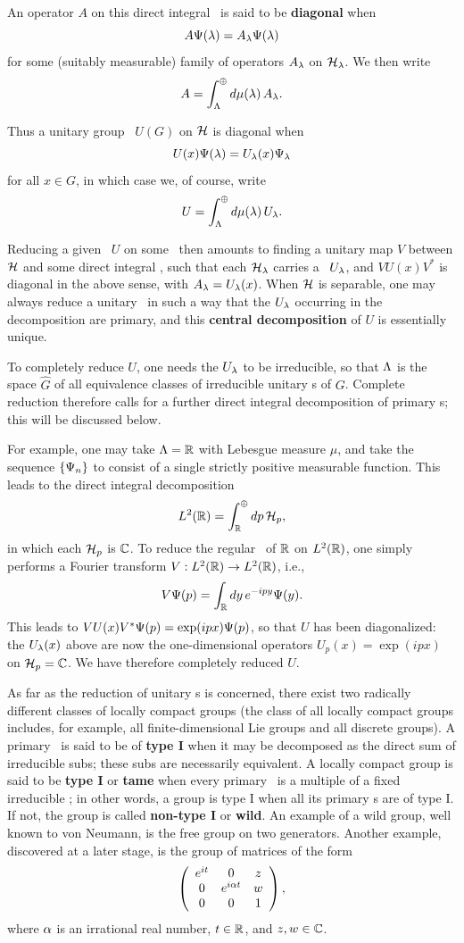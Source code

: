 An operator $A$ on this direct integral \Hs\ is said to be {\bf
diagonal} when
$$
A\Psi(\lambda)=A_{\lambda}\Psi(\lambda)
$$
 for some (suitably measurable) family of operators $A_{\lambda}$ on
${\cal H}_{\lambda}$. We then write
$$
A=\int_{\Lambda}^{\oplus}d\mu(\lambda)\, A_{\lambda}.
$$

Thus a unitary group \rep\ $U(G)$ on ${\cal H}$ is diagonal when
$$
U(x)\Psi(\lambda)=U_{\lambda}(x)\Psi_{\lambda}
$$
for all $x\in G$, in which case we, of course, write
$$
U=\int_{\Lambda}^{\oplus}d\mu(\lambda)\, U_{\lambda}.
$$

Reducing a given \rep\ $U$ on some \Hs\ then amounts to finding a
unitary map $V$ between ${\cal H}$ and some direct integral \Hs, such that
each ${\cal H}_{\lambda}$ carries a \rep\ $U_{\lambda}$, and $VU(x)V^*$ is diagonal
in the above sense, with $A_{\lambda}=U_{\lambda}(x)$.  When ${\cal H}$ is
separable, one may always reduce a unitary \rep\ in such a way that
the $U_{\lambda}$ occurring in the decomposition are primary, and this
{\bf central decomposition} of $U$ is essentially unique.

To completely reduce $U$, one needs the $U_{\lambda}$ to be irreducible,
so that $\Lambda$ is the space $\hat{G}$ of all equivalence classes of
irreducible unitary \rep s of $G$.  Complete reduction therefore calls
for a further direct integral decomposition of primary \rep s; this
will be discussed below.

For example, one may take $\Lambda={\Bbb R}$ with Lebesgue measure $\mu$, and
take the sequence $\{\Psi_n\}$ to consist of a single strictly positive
measurable function. This leads to the direct integral decomposition
$$
L^2({\Bbb R})=\int_{{\Bbb R}}^{\oplus}dp\, {\cal H}_p,
$$
in which each ${\cal H}_p$ is ${\Bbb C}$. To reduce the regular \rep\ of ${\Bbb R}$ on
$L^2({\Bbb R})$, one simply performs a Fourier transform $V:L^2({\Bbb R})\rightarrow
L^2({\Bbb R})$, i.e.,
$$
V\Psi(p)=\int_{{\Bbb R}}dy\, e^{-ipy}\Psi(y).
$$
This leads to $VU(x)V^*\Psi(p)=\exp(ipx)\Psi(p)$, so that $U$ has been
diagonalized: the $U_{\lambda}(x)$ above are now the one-dimensional
operators $U_p(x)=\exp(ipx)$ on ${\cal H}_p={\Bbb C}$. We have therefore
completely reduced $U$.

As far as the reduction of unitary \rep s is concerned, there exist
two radically different classes of locally compact groups (the class
of all locally compact groups includes, for example, all
finite-dimensional Lie groups and all discrete groups).  A primary
\rep\ is said to be of {\bf type I} when it may be decomposed as the
direct sum of irreducible sub\rep s; these sub\rep s are necessarily
equivalent.  A locally compact group is said to be {\bf type I} or
{\bf tame} when every primary \rep\ is a multiple of a fixed
irreducible \rep; in other words, a group is type I when all its
primary \rep s are of type I.  If not, the group is called {\bf
non-type I} or {\bf wild}.  An example of a wild group, well known to
von Neumann, is the free group on two generators. Another example,
discovered at a later stage, is the group of matrices of the form
$$
\left(
\begin{array}{ccc}
e^{it} & 0 & z \\ 0 & e^{i\alpha t} & w \\ 0 & 0 & 1
\end{array}
\right) ,
$$
where $\alpha$ is an irrational real number, $t\in{\Bbb R}$, and $z,w\in{\Bbb C}$.


